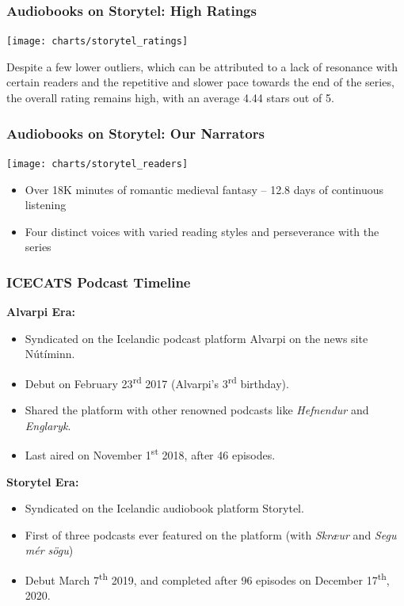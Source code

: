 \documentclass{beamer}
\begin{document}
    \begin{frame}
        \frametitle{Audiobooks on Storytel: High Ratings}
        \texttt{[image: charts/storytel\_ratings]}

        Despite a few lower outliers, which can be attributed to a lack of resonance with certain readers and the
        repetitive and slower pace towards the end of the series, the overall rating remains high, with an average
        4.44 stars out of 5.


    \end{frame}

    \begin{frame}
        \frametitle{Audiobooks on Storytel: Our Narrators}
        \texttt{[image: charts/storytel\_readers]}
        \vspace{-18pt}
        \begin{itemize}
            \item Over 18K minutes of romantic medieval fantasy -- 12.8 days of continuous listening
            \item Four distinct voices with varied reading styles and perseverance with the series
        \end{itemize}
    \end{frame}

    \begin{frame}
        \frametitle{ICECATS Podcast Timeline}

        \textbf{Alvarpi\dh{} Era:}
        \begin{itemize}
            \item Syndicated on the Icelandic podcast platform Alvarpi\dh{} on the news site N\'{u}t\'{i}minn.
            \item Debut on February 23\textsuperscript{rd} 2017 (Alvarpi\dh's 3\textsuperscript{rd} birthday).
            \item Shared the platform with other renowned podcasts like \emph{Hefnendur} and \emph{Englaryk}.
            \item Last aired on November 1\textsuperscript{st} 2018, after 46 episodes.
        \end{itemize}

        \textbf{Storytel Era:}
        \begin{itemize}
            \item Syndicated on the Icelandic audiobook platform Storytel.
            \item First of three podcasts ever featured on the platform
            (with \emph{Skr\ae{}\dh{}ur} and \emph{Seg\dh{}u m\'{e}r s\"{o}gu})
            \item Debut March 7\textsuperscript{th} 2019, and completed after 96 episodes on December 17\textsuperscript{th}, 2020.
        \end{itemize}

    \end{frame}
\end{document}
